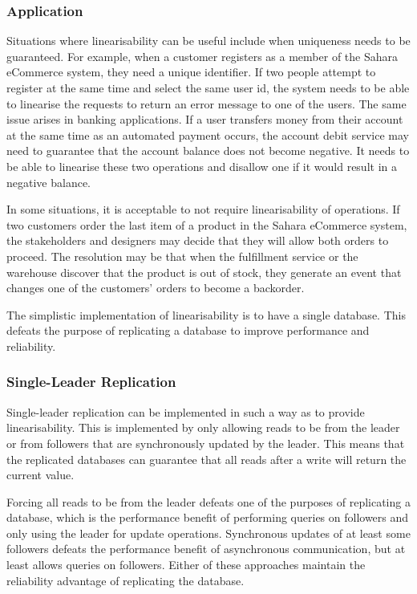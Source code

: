 \subsubsection{Application}

Situations where linearisability can be useful include when uniqueness needs to be guaranteed.
For example, when a customer registers as a member of the Sahara eCommerce system,
they need a unique identifier.
If two people attempt to register at the same time and select the same user id,
the system needs to be able to linearise the requests to return an error message to one of the users.
The same issue arises in banking applications.
If a user transfers money from their account at the same time as an automated payment occurs,
the account debit service may need to guarantee that the account balance does not become negative.
It needs to be able to linearise these two operations and disallow one if it would result in a negative balance.

In some situations, it is acceptable to not require linearisability of operations.
If two customers order the last item of a product in the Sahara eCommerce system,
the stakeholders and designers may decide that they will allow both orders to proceed.
The resolution may be that when the fulfillment service or the warehouse discover that
the product is out of stock, they generate an event that changes one of the customers' orders to become a backorder.

The simplistic implementation of linearisability is to have a single database.
This defeats the purpose of replicating a database to improve performance and reliability.

\subsubsection{Single-Leader Replication}\label{sec:slr}
Single-leader replication can be implemented in such a way as to provide linearisability.
This is implemented by only allowing reads to be from the leader or from followers that are synchronously updated by the leader.
This means that the replicated databases can guarantee that all reads after a write will return the current value.

Forcing all reads to be from the leader defeats one of the purposes of replicating a database,
which is the performance benefit of performing queries on followers and only using the leader for update operations.
Synchronous updates of at least some followers defeats the performance benefit of asynchronous communication,
but at least allows queries on followers.
Either of these approaches maintain the reliability advantage of replicating the database.


